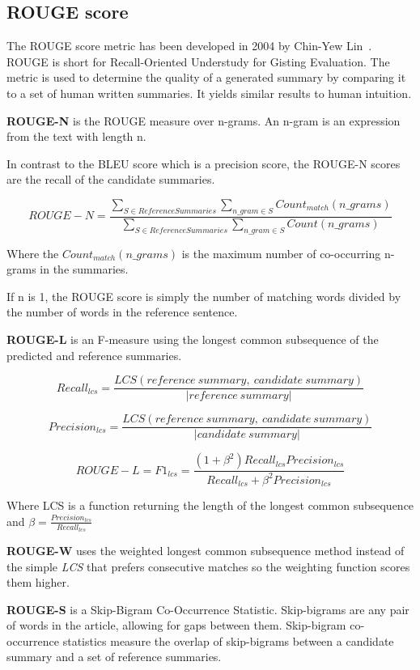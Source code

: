 \subsection{ROUGE score}
The ROUGE score metric has been developed in 2004 by Chin-Yew Lin~\cite{ROUGE}. ROUGE is short for Recall-Oriented Understudy for Gisting Evaluation. The metric is used to determine the quality of a generated summary by comparing it to a set of human written summaries. It yields similar results to human intuition.

\textbf{ROUGE-N} is the ROUGE measure over n-grams. An n-gram is an expression from the text with length n.

In contrast to the BLEU score which is a precision score, the ROUGE-N scores are the recall of the candidate summaries.

\[ROUGE-N = \frac{\sum_{S \in ReferenceSummaries}\sum_{n\_gram \in S} Count_{match} (n\_grams)}{\sum_{S \in ReferenceSummaries}\sum_{n\_gram \in S} Count(n\_grams)}\]

Where the \(Count_{match}(n\_grams)\) is the maximum number of co-occurring n-grams in the summaries.

If n is 1, the ROUGE score is simply the number of matching words divided by the number of words in the reference sentence.

\textbf{ROUGE-L} is an F-measure using the longest common subsequence of the predicted and reference summaries.

\[Recall_{lcs} = \frac{LCS(reference\ summary,\ candidate\ summary)}{|reference\ summary|}\]

\[Precision_{lcs} = \frac{LCS(reference\ summary,\ candidate\ summary)}{|candidate\ summary|}\]

\[ROUGE-L = F1_{lcs} = \frac{(1 + \beta^2)Recall_{lcs}Precision_{lcs}}{Recall_{lcs} + \beta^2Precision_{lcs}}\]

Where LCS is a function returning the length of the longest common subsequence and \(\beta = \frac{Precision_{lcs}}{Recall_{lcs}}\)

\textbf{ROUGE-W} uses the weighted longest common subsequence method instead of the simple \textit{LCS} that prefers consecutive matches so the weighting function scores them higher.

\textbf{ROUGE-S} is a Skip-Bigram Co-Occurrence Statistic. Skip-bigrams are any pair of words in the article, allowing for gaps between them. Skip-bigram co-occurrence statistics measure the overlap of skip-bigrams between a candidate summary and a set of reference summaries.

